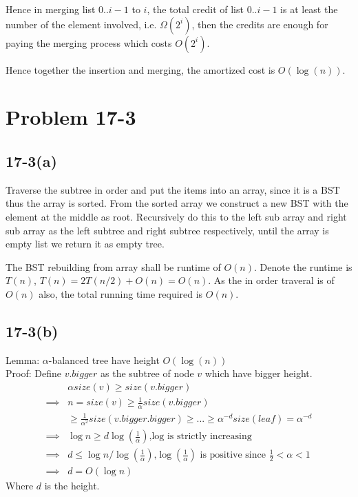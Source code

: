 \documentclass[12pt]{article}
\begin{document}
  Hence in merging list $0..i-1$ to $i$,
  the total credit of list $0..i-1$ is at least the number of the element involved,
  i.e. $\Omega(2^i)$, then the credits are enough for paying the merging process which costs $O(2^i)$.

  Hence together the insertion and merging, the amortized cost is $O(\log(n))$.

  \section*{Problem 17-3}
  \subsection*{17-3(a)}


  Traverse the subtree in order and put the items into an array,
  since it is a BST thus the array is sorted.
  From the sorted array we construct a new BST with the element at the middle as root.
  Recursively do this to the left sub array and right sub array as the left subtree and right subtree respectively,
  until the array is empty list we return it as empty tree.
  
  The BST rebuilding from array shall be runtime of $O(n)$.
  Denote the runtime is $T(n)$, $T(n) = 2T(n/2) + O(n) = O(n)$.
  As the in order traveral is of $O(n)$ also,
  the total running time required is $O(n)$.

  \subsection*{17-3(b)}
Lemma: $\alpha$-balanced tree have height $O(\log(n))$\\
Proof: Define $v.bigger$ as the subtree of node $v$ which have bigger height.
$$
\begin{aligned}
&\alpha size(v) \ge size(v.bigger)\\
\implies& n = size(v) \ge \frac{1}{\alpha} size(v.bigger) \\
& \ge \frac{1}{\alpha^2} size(v.bigger.bigger) \ge ... \ge \alpha^{-d} size(leaf) = \alpha^{-d}\\
\implies& \log{n} \ge d\log(\frac{1}{\alpha}) \text{,log is strictly increasing}\\
\implies& d \le \log{n}/\log(\frac{1}{\alpha}) \text{,$\log(\frac{1}{\alpha})$ is positive since $\frac{1}{2}<\alpha<1$}\\
\implies& d = O(\log{n})
\end{aligned}
$$ Where $d$ is the height.\\
\end{document}
